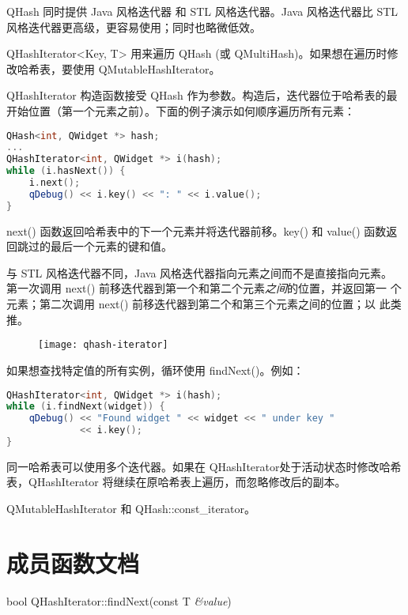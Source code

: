 QHash 同时提供 Java 风格迭代器 和 STL 风格迭代器。Java 风格迭代器比 STL 风格迭代器更高级，更容易使用；同时也略微低效。

QHashIterator<Key, T> 用来遍历 QHash (或 QMultiHash)。如果想在遍历时修改哈希表，要使用 QMutableHashIterator。

QHashIterator 构造函数接受 QHash 作为参数。构造后，迭代器位于哈希表的最开始位置（第一个元素之前）。下面的例子演示如何顺序遍历所有元素：

\begin{lstlisting}[language=C++]
QHash<int, QWidget *> hash;
...
QHashIterator<int, QWidget *> i(hash);
while (i.hasNext()) {
    i.next();
    qDebug() << i.key() << ": " << i.value();
}
\end{lstlisting}

next() 函数返回哈希表中的下一个元素并将迭代器前移。key() 和 value() 函数返回跳过的最后一个元素的键和值。

与 STL 风格迭代器不同，Java 风格迭代器指向元素之间而不是直接指向元素。
第一次调用 next() 前移迭代器到第一个和第二个元素\emph{之间}的位置，并返回第一
个元素；第二次调用 next() 前移迭代器到第二个和第三个元素之间的位置；以
此类推。


\begin{figure}[hbt!]  
	\centering
    \texttt{[image: qhash-iterator]}
\end{figure}

如果想查找特定值的所有实例，循环使用 findNext()。例如：

\begin{lstlisting}[language=C++]
QHashIterator<int, QWidget *> i(hash);
while (i.findNext(widget)) {
    qDebug() << "Found widget " << widget << " under key "
             << i.key();
}
\end{lstlisting}

同一哈希表可以使用多个迭代器。如果在 QHashIterator处于活动状态时修改哈希表，QHashIterator 将继续在原哈希表上遍历，而忽略修改后的副本。


\begin{seeAlso}
QMutableHashIterator 和 QHash::const\_iterator。
\end{seeAlso}

\splitLine

\section{成员函数文档}

bool QHashIterator::findNext(const T \emph{\&value})

